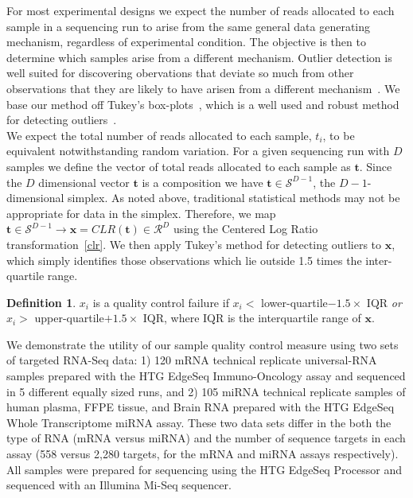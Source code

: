 \documentclass{article}\usepackage[]{graphicx}\usepackage[]{color}
\theoremstyle{definition}
\newtheorem{definition}{Definition}
\begin{document}
For most experimental designs we expect the number of reads allocated to each sample in a sequencing run to arise from the same general data generating mechanism, regardless of experimental condition.  The objective is then to determine which samples arise from a different mechanism.  Outlier detection is well suited for discovering obervations that deviate so much from other observations that they are likely to have arisen from a different mechanism~\cite{Hawkins1980}.  We base our method off Tukey's box-plots~\cite{Tukey1977}, which is a well used and robust method for detecting outliers~\cite{Ben-Gal2009}.\\

We expect the total number of reads allocated to each sample, $t_i$, to be equivalent notwithstanding random variation. For a given sequencing run with $D$ samples we define the vector of total reads allocated to each sample as $\mathbf{t}$.  Since the $D$ dimensional vector $\mathbf{t}$ is a composition we have $\mathbf{t} \in \mathcal{S}^{D-1}$, the $D-1$-dimensional simplex. As noted above, traditional statistical methods may not be appropriate for data in the simplex.  Therefore, we map $\mathbf{t} \in \mathcal{S}^{D-1} \rightarrow \mathbf{x} = CLR(\mathbf{t}) \in \mathcal{R}^D$ using the Centered Log Ratio transformation~\ref{clr}.  We then apply Tukey's method for detecting outliers to $\mathbf{x}$, which simply identifies those observations which lie outside 1.5 times the inter-quartile range.

\theoremstyle{definition}
\begin{definition}
$x_i$ is a quality control failure if $x_i <$ lower-quartile$- 1.5 \times$ IQR \emph{or}  $x_i >$ upper-quartile$+ 1.5 \times$ IQR, where IQR is the interquartile range of $\mathbf{x}$.
\end{definition}

We demonstrate the utility of our sample quality control measure using two sets of targeted RNA-Seq data: 1) 120 mRNA technical replicate universal-RNA samples prepared with the HTG EdgeSeq Immuno-Oncology assay and sequenced in 5 different equally sized runs, and 2) 105 miRNA technical replicate samples of human plasma, FFPE tissue, and Brain RNA prepared with the HTG EdgeSeq Whole Transcriptome miRNA assay.  These two data sets differ in the both the type of RNA (mRNA versus miRNA) and the number of sequence targets in each assay (558 versus 2,280 targets, for the mRNA and miRNA assays respectively).  All samples were prepared for sequencing using the HTG EdgeSeq Processor and sequenced with an Illumina Mi-Seq sequencer.\\
\end{document}
